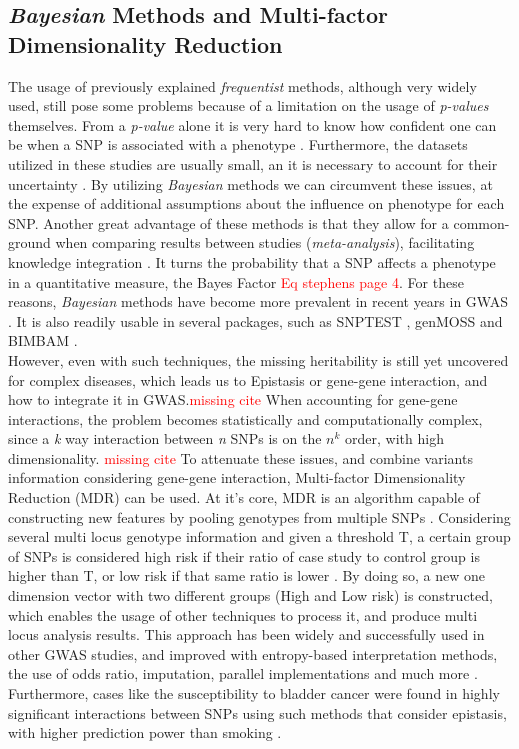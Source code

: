 \subsection{\textit{Bayesian} Methods and Multi-factor Dimensionality Reduction}
The usage of previously explained \textit{frequentist} methods, although very widely used, still pose some problems because of a limitation on the usage of \textit{p-values} themselves. From a \textit{p-value} alone it is very hard to know how confident one can be when a SNP is associated with a phenotype \cite{ioannidis2008effect}. Furthermore, the datasets utilized in these studies are usually small, an it is necessary to account for their uncertainty \cite{o2008bayesian}. By utilizing \textit{Bayesian} methods we can circumvent these issues, at the expense of additional assumptions about the influence on phenotype for each SNP. Another great advantage of these methods is that they allow for a common-ground when comparing results between studies (\textit{meta-analysis}), facilitating knowledge integration \cite{stephens2009bayesian}. It turns the probability that a SNP affects a phenotype in a quantitative measure, the Bayes Factor \textcolor{red}{Eq stephens page 4}. For these reasons, \textit{Bayesian} methods have become more prevalent in recent years in GWAS \cite{fernando2017application}. It is also readily usable in several packages, such as SNPTEST \cite{marchini2007new}, genMOSS \cite{friedlander2016analyzing} and BIMBAM \cite{guan2008practical}.\\
However, even with such techniques, the missing heritability is still yet uncovered for complex diseases, which leads us to Epistasis or gene-gene interaction, and how to integrate it in GWAS.\textcolor{red}{missing cite} When accounting for gene-gene interactions, the problem becomes statistically and computationally complex, since a \textit{k} way interaction between \textit{n} SNPs is on the $n^k$ order, with high dimensionality.\textcolor{red}{ missing cite} To attenuate these issues, and combine variants information considering gene-gene interaction, Multi-factor Dimensionality Reduction (MDR) can be used. At it's core, MDR is an algorithm capable of constructing new features by pooling genotypes from multiple SNPs \cite{moore2006flexible}. Considering several multi locus genotype information and given a threshold T, a certain group of SNPs is considered high risk if their ratio of case study to control group is higher than T, or low risk if that same ratio is lower \cite{moore2010bioinformatics}. By doing so, a new one dimension vector with two different groups (High and Low risk) is constructed, which enables the usage of other techniques to process it, and produce multi locus analysis results. This approach has been widely and successfully used in other GWAS studies, and improved with entropy-based interpretation methods, the use of odds ratio, imputation, parallel implementations and much more \cite{moore2006flexible}. Furthermore, cases like the susceptibility to bladder cancer were found in highly significant interactions between SNPs using such methods that consider epistasis, with higher prediction power than smoking \cite{stern2009polymorphisms}.

